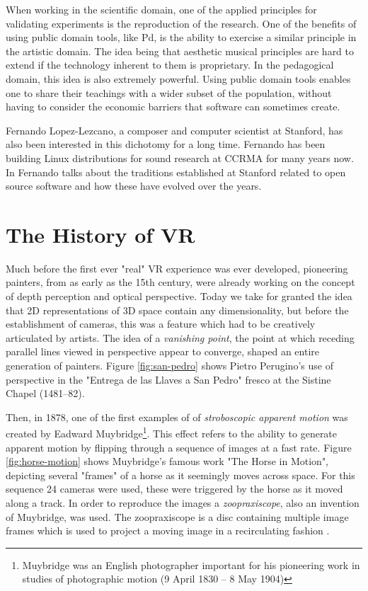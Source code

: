 When working in the scientific domain, one of the applied principles for validating experiments is the reproduction of the research. One of the benefits of using public domain tools, like Pd, is the ability to exercise a similar principle in the artistic domain. The idea being that aesthetic musical principles are hard to extend if the technology inherent to them is proprietary. In the pedagogical domain, this idea is also extremely powerful. Using public domain tools enables one to share their teachings with a wider subset of the population, without having to consider the economic barriers that software can sometimes create. 

Fernando Lopez-Lezcano, a composer and computer scientist at Stanford, has also been interested in this dichotomy for a long time. Fernando has been building Linux distributions for sound research at CCRMA for many years now. In \cite{CEC-eCon28-online} Fernando talks about the traditions established at Stanford related to open source software and how these have evolved over the years. 


\section{The History of VR}

Much before the first ever "real" VR experience was ever developed, pioneering painters, from as early as the 15th century, were already working on the concept of depth perception and optical perspective. Today we take for granted the idea that 2D representations of 3D space contain any dimensionality, but before the establishment of cameras, this was a feature which had to be creatively articulated by artists. The idea of a \textit{vanishing point}, the point at which receding parallel lines viewed in perspective appear to converge, shaped an entire generation of painters. Figure \ref{fig:san-pedro} shows Pietro Perugino's use of perspective in the "Entrega de las Llaves a San Pedro" fresco at the Sistine Chapel (1481–82).

Then, in 1878, one of the first examples of of \textit{stroboscopic apparent motion} was created by Eadward Muybridge\footnote{Muybridge was an English photographer important for his pioneering work in studies of photographic motion (9 April 1830 – 8 May 1904)}. This effect refers to the ability to generate apparent motion by flipping through a sequence of images at a fast rate. Figure \ref{fig:horse-motion} shows Muybridge's famous work "The Horse in Motion", depicting several "frames" of a horse as it seemingly moves across space. For this sequence 24 cameras were used, these were triggered by the horse as it moved along a track. In order to reproduce the images a \textit{zoopraxiscope}, also an invention of Muybridge, was used. The zoopraxiscope is a disc containing multiple image frames which is used to project a moving image in a recirculating fashion \cite{lavalle2016virtual}.

